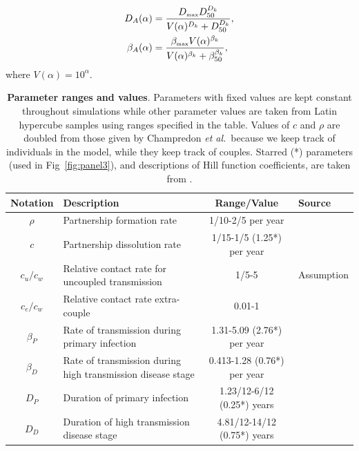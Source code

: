 \documentclass[10pt,letterpaper]{article}
\renewcommand{\figurename}{Fig}
\newcommand{\etal}{\textit{et al.}}
\newcommand{\tsub}[2]{#1_{{\textrm{\tiny #2}}}}
\begin{document}
\begin{equation}
\begin{split}
D_A(\alpha) &= \frac{\tsub{D}{max} D_{50} ^{D_k}}{V(\alpha) ^{D_k} + D_{50}^{D_k}}, \\
\beta_A(\alpha) &= \frac{\tsub{\beta}{max} V(\alpha) ^ {\beta_k}}%
{V(\alpha)^{\beta_k} + \beta_{50} ^{\beta_k}},
\end{split}
\label{eq:hillfuns}
\end{equation}
where $V(\alpha) = 10^\alpha$. 


\begin{table}[h!]
\caption{\textbf{Parameter ranges and values}. Parameters with fixed values are kept constant throughout simulations while other parameter values are taken from Latin hypercube samples using ranges specified in the table. Values of $c$ and $\rho$ are doubled from those given by Champredon \etal\ because we keep track of individuals in the model, while they keep track of couples. Starred (*) parameters (used in \figurename~\ref{fig:panel3}), and descriptions of Hill function coefficients, are taken from \cite{shirreff_transmission_2011}.}
\centering
\begin{tabular}{c p{2in} c l}
\hline 
Notation & Description & Range/Value & Source\\
\hline %
$\rho$ & Partnership formation rate & 1/10-2/5 per year & \cite{champredon_hiv_2013} \\
$c$ & Partnership dissolution rate & 1/15-1/5 (1.25*) per year & \cite{champredon_hiv_2013} \\
$c_u/c_w$ & Relative contact rate for uncoupled transmission & 1/5-5 & Assumption \\
$c_e/c_w$ & Relative contact rate extra-couple & 0.01-1 & \cite{champredon_hiv_2013} \\
$\beta_P$ & Rate of transmission during primary infection & 1.31-5.09 (2.76*) per year & \cite{hollingsworth_hiv1_2008} \\
$\beta_D$ & Rate of transmission during high transmission disease stage & 0.413-1.28 (0.76*) per year & \cite{hollingsworth_hiv1_2008} \\
$D_P$ & Duration of primary infection & 1.23/12-6/12 (0.25*) years & \cite{hollingsworth_hiv1_2008} \\
$D_D$ & Duration of high transmission disease stage & 4.81/12-14/12 (0.75*) years & \cite{hollingsworth_hiv1_2008} \\

\end{tabular}
\end{table}
\end{document}
